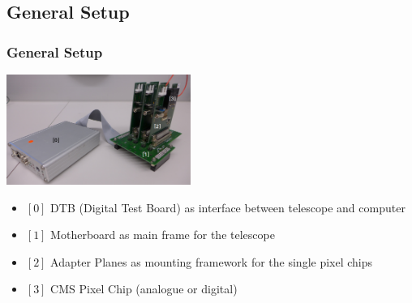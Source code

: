\documentclass[9pt]{beamer}
\begin{document}
\subsection{General Setup}
\begin{frame}
	\frametitle{General Setup}
	\begin{center}
		\includegraphics[width=6cm]{Pics/setup}
	\end{center}
	\begin{itemize}
		\item $[0]$ DTB (Digital Test Board) as interface between telescope and computer
		\item $[1]$ Motherboard as main frame for the telescope
		\item $[2]$ Adapter Planes as mounting framework for the single pixel chips
		\item $[3]$ CMS Pixel Chip (analogue or digital)
	\end{itemize}
\end{frame}
\end{document}

